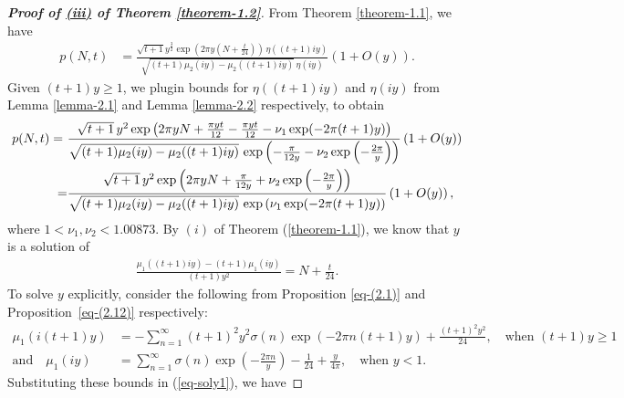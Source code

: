 \documentclass[11pt]{amsart}
\theoremstyle{plain}
\numberwithin{equation}{section}
\begin{document}
		\begin{proof}[\textbf{\boldmath Proof of  \hyperlink{thm1.2iii}{{(iii)}} of Theorem \ref{theorem-1.2}}]
			From Theorem \ref{theorem-1.1}, we have
			\begin{align*}
				p(N,t)&=\frac{\sqrt{t+1}y^{\frac{3}{2}} \exp\left(2\pi y\left(N+\frac{t}{24}\right)\right)\,\eta((t+1)iy)}{\sqrt{(t+1)\mu_{2}(iy)-\mu_{2}((t+1)iy)}\,\eta(iy)}\left(1+O(y)\right).   
			\end{align*}
			Given $(t+1)y \ge 1$, we plugin bounds for $\eta((t+1)iy)$ and $\eta(iy)$ from Lemma \ref{lemma-2.1} and Lemma \ref{lemma-2.2} respectively, to obtain 
			\begin{align}\label{eq-proofi}
				\notag
				p(N,t) =\ 
				& \frac{\sqrt{t+1} \, y^{2} \exp\left(2\pi y N +\frac{\pi yt}{12}-\frac{\pi yt}{12}-\nu_{1} \exp(-2\pi(t+1)y)\right)}{
					\sqrt{(t+1)\mu_{2}(iy) - \mu_{2}((t+1)iy)} \, \exp\left(-\frac{\pi}{12y} -\nu_{2} \exp\left(-\frac{2\pi}{y}\right)\right)}\left(1+O(y)\right)\\
				\ 
				=& \frac{\sqrt{t+1} \, y^{2} \exp\left(2\pi y N +\frac{\pi}{12y}+\nu_{2} \exp\left(-\frac{2\pi}{y}\right)\right)}{
					\sqrt{(t+1)\mu_{2}(iy) - \mu_{2}((t+1)iy)} \, \exp\left(\nu_{1} \exp(-2\pi(t+1)y) \right)}\left(1+O(y)\right),
			\end{align}
			where $1 < \nu_1, \nu_2 < 1.00873$.
			\newline
			By $(i)$ of Theorem (\ref{theorem-1.1}), we know that $y$ is a solution of 
			\begin{align}\label{eq-soly1}
				\frac{\mu_{1}((t+1)iy) - (t+1)\mu_{1}(iy)}{(t+1)y^{2}} = N + \frac{t}{24}. 
			\end{align}
			To solve $y$ explicitly, consider the following from  Proposition \ref{eq-(2.1)} and Proposition~\ref{eq-(2.12)} respectively:
			\begin{align*}
				\mu_{1}(i(t+1)y)&=-\sum_{n=1}^{\infty}(t+1)^{2}y^{2}\sigma(n)\exp(-2\pi n(t+1)y)+\frac{(t+1)^{2}y^{2}}{24},\quad \text{when  $(t+1)y\ge 1$}\\  
				\text{and}\quad	\mu_{1}(iy)&=\sum_{n=1}^{\infty}\sigma(n)\exp\left(-\frac{2\pi n}{y}\right) -\frac{1}{24}+\frac{y}{4\pi},\quad\text{when $y<1$}.   
			\end{align*} 
			Substituting these bounds in (\ref{eq-soly1}), we have

\end{proof}
\end{document}
